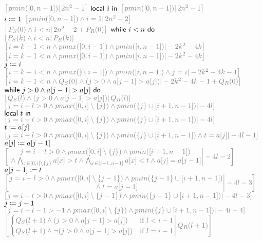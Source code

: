 \begin{figure}[t!]
\centering
\begin{algorithmic}[1]\small
  \State $\Gray{\SR{pmin([0,n-1])}{2n^2-1}}$
  \State $\textsf{local}~i~\textsf{in}$
  \Indent
  \State $\Gray{\SR{pmin([0,n-1])}{2n^2-1}}$
  \State $i\coloneqq1$
  \State $\Gray{\SR{pmin([0,n-1])\land i=1}{2n^2-2}}$
  \State $\Gray{\SR{P_S(0)\land i<n}{2n^2-2+P_R(0)}}$
  \State $\textsf{while}~i<n~\textsf{do}$
  \Indent
    \State $\Gray{\SR{P_S(k)\land i<n}{P_R(k)}}$
    \State $\Gray{\SR{i=k+1<n\land pmax([0,i-1])\land pmin([i,n-1])}{-2k^2-4k}}$
    \State {}
    \Indent
      \State $\Gray{\SR{i=k+1<n\land pmax([0,i-1])\land pmin([i,n-1])}{-2k^2-4k}}$
      \State $j\coloneqq i$
      \State $\Gray{\SR{i=k+1<n\land pmax([0,i-1])\land pmin([i,n-1])\land j=i}{-2k^2-4k-1}}$
      \State $\Gray{\SR{i=k+1<n\land Q_S(0)\land (j>0\land a[j-1]>a[j])}{-2k^2-4k-1+Q_R(0)}}$
      \State $\textsf{while}~j>0\land a[j-1]>a[j]~\textsf{do}$
      \Indent
        \State $\Gray{\SR{Q_S(l)\land(j>0\land a[j-1]>a[j])}{Q_R(l)}}$
        \State $\Gray{\SR{j=i-l>0\land pmax([0,i]\setminus\{j\})\land pmin(\{j\}\cup[i+1,n-1])}{-4l}}$
        \State $\textsf{local}~t~\textsf{in}$
        \Indent
          \State $\Gray{\SR{j=i-l>0\land pmax([0,i]\setminus\{j\})\land pmin(\{j\}\cup[i+1,n-1])}{-4l}}$
          \State $t\coloneqq a[j]$
          \State $\Gray{\SR{j=i-l>0\land pmax([0,i]\setminus\{j\})\land pmin(\{j\}\cup[i+1,n-1])\land t=a[j]}{-4l-1}}$
          \State $a[j]\coloneqq a[j-1]$
          \State $\Gray{\SR{\begin{matrix}j=i-l>0\land pmax([0,i]\setminus\{j\})\land pmin([i+1,n-1])\\{}\land\bigwedge_{x\in[0,i]\setminus\{j\}}a[x]>t\land\bigwedge_{x\in[i+1,n-1]}a[x]< t\land a[j]=a[j-1]\end{matrix}}{-4l-2}}$
          \State $a[j-1]\coloneqq t$
          \State $\Gray{\SR{\begin{matrix}j=i-l>0\land pmax([0,i]\setminus\{j-1\})\land pmin(\{j-1\}\cup[i+1,n-1])\\{}\land t=a[j-1]\end{matrix}}{-4l-3}}$
        \EndIndent
        \State $\Gray{\SR{j=i-l>0\land pmax([0,i]\setminus\{j-1\})\land pmin(\{j-1\}\cup[i+1,n-1])}{-4l-3}}$
        \State $j\coloneqq j-1$
        \State $\Gray{\SR{j=i-l-1>-1\land pmax([0,i]\setminus\{j\})\land pmin(\{j\}\cup[i+1,n-1])}{-4l-4}}$
        \State $\Gray{\SR{\begin{cases}Q_S(l+1)\land(j>0\land a[j-1]>a[j])&\text{if }l<i-1\\Q_S(l+1)\land\neg(j>0\land a[j-1]>a[j])&\text{if }l=i-1\end{cases}}{Q_R(l+1)}}$

\end{algorithmic}
\end{figure}

